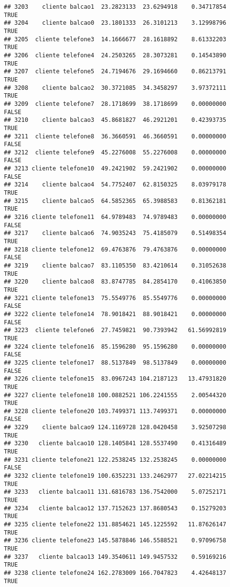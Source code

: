 \documentclass[
]{article}
\begin{document}
\begin{verbatim}
## 3203    cliente balcao1  23.2823133  23.6294918    0.34717854     TRUE
## 3204    cliente balcao0  23.1801333  26.3101213    3.12998796     TRUE
## 3205  cliente telefone3  14.1666677  28.1618892    8.61332203     TRUE
## 3206  cliente telefone4  24.2503265  28.3073281    0.14543890     TRUE
## 3207  cliente telefone5  24.7194676  29.1694660    0.86213791     TRUE
## 3208    cliente balcao2  30.3721085  34.3458297    3.97372111     TRUE
## 3209  cliente telefone7  28.1718699  38.1718699    0.00000000    FALSE
## 3210    cliente balcao3  45.8681827  46.2921201    0.42393735     TRUE
## 3211  cliente telefone8  36.3660591  46.3660591    0.00000000    FALSE
## 3212  cliente telefone9  45.2276008  55.2276008    0.00000000    FALSE
## 3213 cliente telefone10  49.2421902  59.2421902    0.00000000    FALSE
## 3214    cliente balcao4  54.7752407  62.8150325    8.03979178     TRUE
## 3215    cliente balcao5  64.5852365  65.3988583    0.81362181     TRUE
## 3216 cliente telefone11  64.9789483  74.9789483    0.00000000    FALSE
## 3217    cliente balcao6  74.9035243  75.4185079    0.51498354     TRUE
## 3218 cliente telefone12  69.4763876  79.4763876    0.00000000    FALSE
## 3219    cliente balcao7  83.1105350  83.4210614    0.31052638     TRUE
## 3220    cliente balcao8  83.8747785  84.2854170    0.41063850     TRUE
## 3221 cliente telefone13  75.5549776  85.5549776    0.00000000    FALSE
## 3222 cliente telefone14  78.9018421  88.9018421    0.00000000    FALSE
## 3223  cliente telefone6  27.7459821  90.7393942   61.56992819     TRUE
## 3224 cliente telefone16  85.1596280  95.1596280    0.00000000    FALSE
## 3225 cliente telefone17  88.5137849  98.5137849    0.00000000    FALSE
## 3226 cliente telefone15  83.0967243 104.2187123   13.47931820     TRUE
## 3227 cliente telefone18 100.0882521 106.2241555    2.00544320     TRUE
## 3228 cliente telefone20 103.7499371 113.7499371    0.00000000    FALSE
## 3229    cliente balcao9 124.1169728 128.0420458    3.92507298     TRUE
## 3230   cliente balcao10 128.1405841 128.5537490    0.41316489     TRUE
## 3231 cliente telefone21 122.2538245 132.2538245    0.00000000    FALSE
## 3232 cliente telefone19 100.6352231 133.2462977   27.02214215     TRUE
## 3233   cliente balcao11 131.6816783 136.7542000    5.07252171     TRUE
## 3234   cliente balcao12 137.7152623 137.8680543    0.15279203     TRUE
## 3235 cliente telefone22 131.8854621 145.1225592   11.87626147     TRUE
## 3236 cliente telefone23 145.5878846 146.5588521    0.97096758     TRUE
## 3237   cliente balcao13 149.3540611 149.9457532    0.59169216     TRUE
## 3238 cliente telefone24 162.2783009 166.7047823    4.42648137     TRUE

\end{verbatim}
\end{document}
